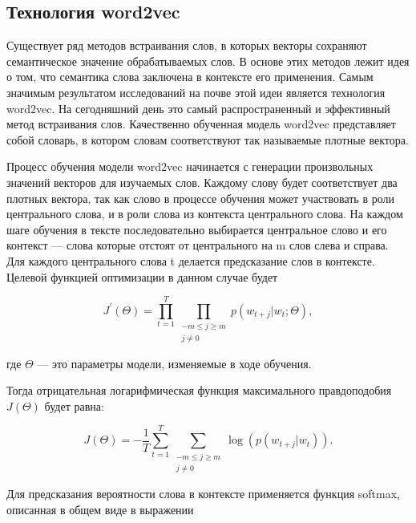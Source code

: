 \subsection{Технология word2vec}\label{subsec:overview:overview_word2vec}
Существует ряд методов встраивания слов, в которых векторы сохраняют семантическое значение обрабатываемых слов. В основе этих методов лежит идея о том, что семантика слова заключена в контексте его применения. Самым значимым результатом исследований на почве этой идеи является технология word2vec. На сегодняшний день это самый распространенный и эффективный метод встраивания слов. Качественно обученная модель word2vec представляет собой словарь, в котором словам соответствуют так называемые плотные вектора\cite{word2vec}.

Процесс обучения модели word2vec начинается с генерации произвольных значений векторов для изучаемых слов. Каждому слову будет соответствует два плотных вектора, так как слово в процессе обучения может участвовать в роли центрального слова, и в роли слова из контекста центрального слова. На каждом шаге обучения в тексте последовательно выбирается центральное слово и его контекст --- слова которые отстоят от центрального на m слов слева и справа. Для каждого центрального слова t делается предсказание слов в контексте\cite{word2vec}. Целевой функцией оптимизации в данном случае будет

\begin{equation} \label{eq:overview:word2vec:Jprime}
  J^{\prime}(\Theta) = \prod_{t=1}^{T}\prod_{\substack{-m\leq j \geq m\\j \neq 0}}p(w_{t+j}|w_{t};\Theta),
\end{equation}
\begin{explanationx}
\item [где] $ \Theta $ --- это параметры модели, изменяемые в ходе обучения.
\end{explanationx}


Тогда отрицательная логарифмическая функция максимального правдоподобия $ J(\Theta) $ будет равна:

\begin{equation} \label{eq:overview:word2vec:J}
  J(\Theta) = -\frac{1}{T}\sum_{t=1}^{T}\sum_{\substack{-m\leq j \geq m\\j \neq 0}}\log(p(w_{t+j}|w_{t})).
\end{equation}

Для предсказания вероятности слова в контексте применяется функция softmax, описанная в общем виде в выражении

